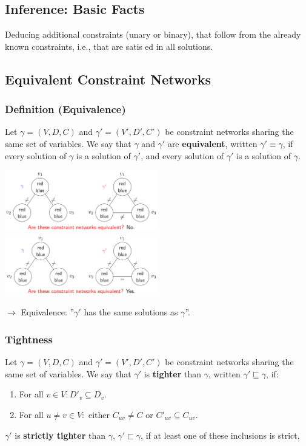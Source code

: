 \documentclass[conference, a4paper]{styles/acmsiggraph}
\begin{document}
    \subsection{Inference: Basic Facts}
        Deducing additional constraints (unary or binary), that follow from the already known constraints, i.e., that are satised in all solutions.
    
    \subsection{Equivalent Constraint Networks}
        \subsubsection{Definition (Equivalence)}
            Let $\gamma = (V,D,C)$ and $\gamma' = (V',D',C')$ be constraint networks sharing the same set of variables.
            We say that $\gamma$ and $\gamma'$ are \textbf{equivalent}, written $\gamma' \equiv \gamma$, if every solution of $\gamma$ is a solution of $\gamma'$, and every solution of $\gamma'$ is a solution of $\gamma$.\newline
            
            \includegraphics[width=0.5\textwidth]{imgs/ECN_NO.png}\ \ \ \ \ \ 
            \includegraphics[width=0.5\textwidth]{imgs/ECN_YES.png}\newline
            
            $\rightarrow$ Equivalence: ''$\gamma'$ has the same solutions as $\gamma$''.
        
        \subsubsection{Tightness}
            Let $\gamma = (V,D,C)$ and $\gamma' = (V',D',C')$ be constraint networks sharing the same set of variables.
            We say that $\gamma'$ is \textbf{tighter} than $\gamma$, written $\gamma' \sqsubseteq \gamma$, if:
                \begin{enumerate}
                    \item For all $v \in V: D'_v \subseteq D_v$.
                    \item For all $u \neq v \in V:$ either $C_{uv} \neq C$ or $C'_{uv} \subseteq C_{uv}$.
                \end{enumerate}
            $\gamma'$ is \textbf{strictly tighter} than $\gamma$, $\gamma' \sqsubset \gamma$, if at least one of these inclusions is strict.
            
\end{document}
